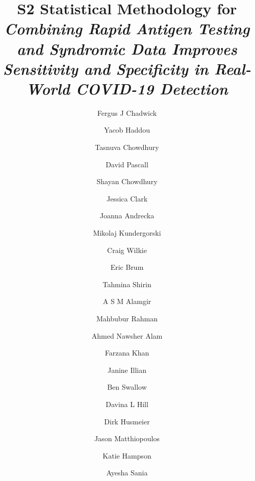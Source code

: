 \documentclass[]{elsarticle} %
\renewenvironment{abstract}{}{}
\begin{document}
\begin{frontmatter}

  \title{\textbf{S2 Statistical Methodology} for \emph{Combining Rapid Antigen Testing and Syndromic Data Improves Sensitivity and Specificity in Real-World COVID-19 Detection}}
    \author[IBAHCM,UoGLMICS]{Fergus J Chadwick}
    \author[IBAHCM,UoGLMICS]{Yacob Haddou}
    \author[IBAHCM]{Tasnuva Chowdhury}
    \author[MRCB]{David Pascall}
    \author[a2i]{Shayan Chowdhury}
    \author[IBAHCM,UoGLMICS]{Jessica Clark}
    \author[UNFAO]{Joanna Andrecka}
    \author[MathsandStatGla,UoGLMICS]{Mikolaj Kundergorski}
    \author[MathsandStatGla,UoGLMICS]{Craig Wilkie}
    \author[UNFAO]{Eric Brum}
    \author[IEDCR]{Tahmina Shirin}
    \author[IEDCR]{A S M Alamgir}
    \author[IEDCR]{Mahbubur Rahman}
    \author[IEDCR]{Ahmed Nawsher Alam}
    \author[IEDCR]{Farzana Khan}
    \author[MathsandStatGla,UoGLMICS]{Janine Illian}
    \author[MathsandStatGla,UoGLMICS]{Ben Swallow}
    \author[IBAHCM,UoGLMICS]{Davina L Hill}
    \author[MathsandStatGla]{Dirk Husmeier}
    \author[IBAHCM,UoGLMICS]{Jason Matthiopoulos}
    \author[IBAHCM,UoGLMICS]{Katie Hampson}
    \author[Columbia]{Ayesha Sania}
      \address[IBAHCM]{Institute of Biodiversity, Animal Health and Comparative Medicine, University of Glasgow}
    \address[UoGLMICS]{COVID-19 in LMICs Research Group, University of Glasgow}
    \address[MRCB]{MRC Biostatistics Unit, University of Cambridge}
    \address[MathsandStatGla]{School of Mathematics and Statistics, University of Glasgow}
    \address[a2i]{a2i, United Nations Development Program, ICT Ministry, Bangladesh}
    \address[UNFAO]{UN FAO in support of the UN Interagency Support Team, Bangladesh}
    \address[IEDCR]{Institute of Epidemiology, Disease Control and Research, Ministry of Health, Bangladesh}
    \address[Columbia]{Division of Developmental Neuroscience, Department of Psychiatry, Columbia University}
  
  \begin{abstract}
  
  \end{abstract}
  
 \end{frontmatter}
\end{document}
